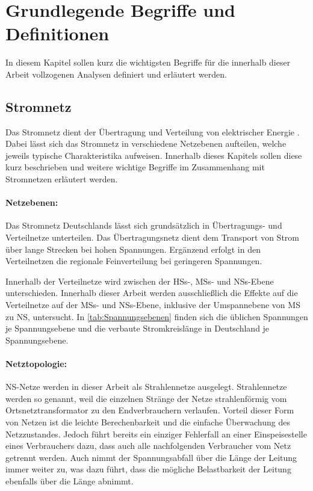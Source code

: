 \section{Grundlegende Begriffe und Definitionen}\label{chap:base_theo}

In diesem Kapitel sollen kurz die wichtigsten Begriffe für die innerhalb dieser Arbeit vollzogenen Analysen definiert und erläutert werden.


\subsection{Stromnetz}\label{chap:theo_grid}

Das Stromnetz dient der Übertragung und Verteilung von elektrischer Energie \cite{Paschotta2020}.
Dabei lässt sich das Stromnetz in verschiedene Netzebenen aufteilen, welche jeweils typische Charakteristika aufweisen.
Innerhalb dieses Kapitels sollen diese kurz beschrieben und weitere wichtige Begriffe im Zusammenhang mit Stromnetzen erläutert werden.


\paragraph{Netzebenen:}

Das Stromnetz Deutschlands lässt sich grundsätzlich in Übertragungs- und Verteilnetze unterteilen.
Das Übertragungsnetz dient dem Transport von Strom über lange Strecken bei hohen Spannungen.
Ergänzend erfolgt in den Verteilnetzen die regionale Feinverteilung bei geringeren Spannungen. \cite{Agora2019}\medskip

Innerhalb der Verteilnetze wird zwischen der \glspl{HS}-, \glspl{MS}- und \glspl{NS}-Ebene unterschieden.
Innerhalb dieser Arbeit werden ausschließlich die Effekte auf die Verteilnetze auf der \glspl{MS}- und \glspl{NS}-Ebene, inklusive der Umspannebene von \gls{MS} zu \gls{NS}, untersucht.
In \autoref{tab:Spannungsebenen} finden sich die üblichen Spannungen je Spannungsebene und die verbaute Stromkreislänge in Deutschland je Spannungsebene.




\paragraph{Netztopologie:}

\gls{NS}-Netze werden in dieser Arbeit als Strahlennetze ausgelegt.
Strahlennetze werden so genannt, weil die einzelnen Stränge der Netze strahlenförmig vom Ortsnetztransformator zu den Endverbrauchern verlaufen.
Vorteil dieser Form von Netzen ist die leichte Berechenbarkeit und die einfache Überwachung des Netzzustandes.
Jedoch führt bereits ein einziger Fehlerfall an einer Einspeisestelle eines Verbrauchers dazu, dass auch alle nachfolgenden Verbraucher vom Netz getrennt werden.
Auch nimmt der Spannungsabfall über die Länge der Leitung immer weiter zu, was dazu führt, dass die mögliche Belastbarkeit der Leitung ebenfalls über die Länge abnimmt. \cite{Agora2019} \cite{WNG2020}\medskip

